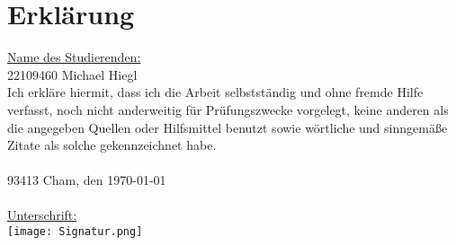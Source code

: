 \documentclass[11pt]{report}
\begin{document}
\chapter{Erklärung}
\underline{Name des Studierenden:}\\
22109460 Michael Hiegl\\

Ich erkläre hiermit, dass ich die Arbeit selbstständig und ohne fremde Hilfe verfasst, noch nicht anderweitig für Prüfungszwecke vorgelegt, keine anderen als die angegeben Quellen oder Hilfsmittel benutzt sowie wörtliche und sinngemäße Zitate als solche gekennzeichnet habe.\\\\

93413 Cham, den \today\\\\
\underline{Unterschrift:}\\
\texttt{[image: Signatur.png]}\\

%
\end{document}
